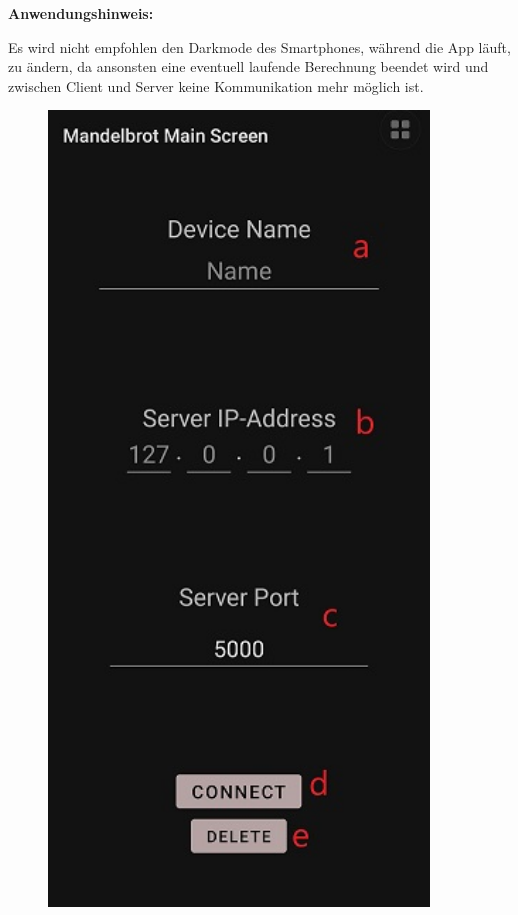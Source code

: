\documentclass[12pt, onecolumn, notitlepage]{scrartcl}
\begin{document}
\textbf{Anwendungshinweis:} \par
Es wird nicht empfohlen den Darkmode des Smartphones, während die App läuft, zu ändern, da ansonsten eine eventuell laufende Berechnung beendet wird und zwischen Client und Server keine Kommunikation mehr möglich ist.

\begin{figure}[H] 
	\begin{minipage}[b]{.4\linewidth}
		\centering
		\includegraphics[height=0.5\textheight, width=0.9\textwidth]{start_screen.jpg}

\end{minipage}
\end{figure}
\end{document}
